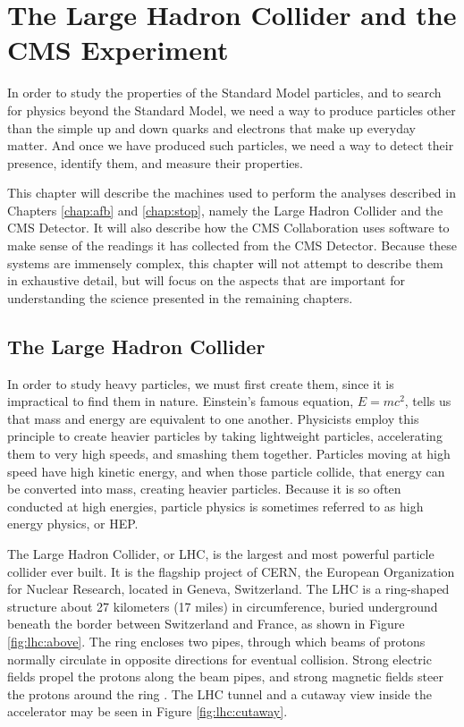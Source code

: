 \chapter{The Large Hadron Collider and the CMS Experiment}
\label{chap:hardware}

In order to study the properties of the Standard Model particles, and
to search for physics beyond the Standard Model, we need a way to
produce particles other than the simple up and down quarks and
electrons that make up everyday matter. And once we have produced such
particles, we need a way to detect their presence, identify them, and
measure their properties.

This chapter will describe the machines used to perform
the analyses described in Chapters \ref{chap:afb} and \ref{chap:stop},
namely the Large Hadron Collider and the CMS Detector. It
will also describe how the CMS Collaboration uses software to make sense of
the readings it has collected from the CMS Detector. Because these
systems are immensely complex, this chapter will not attempt to
describe them in exhaustive detail, but will focus on the aspects that are
important for understanding the science presented in the remaining
chapters.

\section{The Large Hadron Collider}
\label{sec:lhc}

In order to study heavy particles, we must first create them, since
it is impractical to find them in nature.
Einstein's famous equation, $E = mc^2$, tells us that mass and energy
are equivalent to one another. Physicists employ this principle to create
heavier particles by taking lightweight particles, accelerating them to very high
speeds, and smashing them together. Particles moving at high speed
have high kinetic energy, and when those particle collide, that energy
can be converted into mass, creating heavier particles. Because it is
so often conducted at high energies, particle physics is sometimes
referred to as high energy physics, or HEP.

The Large Hadron Collider, or LHC, is the largest and most
powerful particle collider ever built.
It is the flagship project of CERN, the European Organization
for Nuclear Research, located in Geneva, Switzerland.
The LHC is a ring-shaped structure about 27 kilometers (17 miles) in circumference,
buried underground beneath the border between Switzerland and
France, as shown in Figure \ref{fig:lhc:above}. The ring encloses two
pipes, through which beams of protons normally circulate in opposite
directions for eventual collision. Strong electric fields propel the protons along the beam
pipes, and strong magnetic fields steer the protons around the ring
\cite{lhc}. The LHC tunnel and a cutaway view inside the accelerator
may be seen in Figure \ref{fig:lhc:cutaway}.

